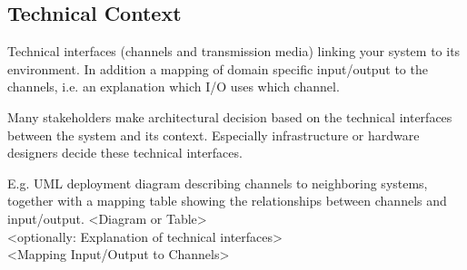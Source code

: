 \subsection{Technical Context}

Technical interfaces (channels and transmission media) linking your system to its environment. In addition a mapping of domain specific input/output to the channels, i.e. an explanation which I/O uses which channel.

Many stakeholders make architectural decision based on the technical interfaces between the system and its context. Especially infrastructure or hardware designers decide these technical interfaces.

E.g. UML deployment diagram describing channels to neighboring systems, together with a mapping table showing the relationships between channels and input/output.
\textless Diagram or Table\textgreater\\
\textless optionally: Explanation of technical interfaces\textgreater\\
\textless Mapping Input/Output to Channels\textgreater

